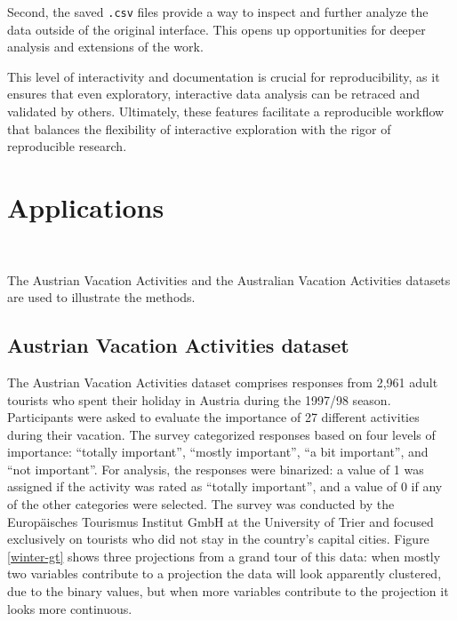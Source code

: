 \documentclass[article]{ajs}
\begin{document}
Second, the saved \texttt{.csv} files provide a way to inspect and further analyze the data outside of the original interface. This opens up opportunities for deeper analysis and extensions of the work.

This level of interactivity and documentation is crucial for reproducibility, as it ensures that even exploratory, interactive data analysis can be retraced and validated by others. Ultimately, these features facilitate a reproducible workflow that balances the flexibility of interactive exploration with the rigor of reproducible research.


\section{Applications}~\label{applications}

The Austrian Vacation Activities \cite{dolnicar2003winter} and the Australian Vacation Activities \cite{cliff2009formative} datasets are used to illustrate the methods.

\subsection{Austrian Vacation Activities dataset}

The Austrian Vacation Activities dataset comprises responses from 2,961 adult tourists who spent their holiday in Austria during the 1997/98 season. Participants were asked to evaluate the importance of 27 different activities during their vacation. The survey categorized responses based on four levels of importance: ``totally important'', ``mostly important'', ``a bit important'', and ``not important''. For analysis, the responses were binarized: a value of 1 was assigned if the activity was rated as ``totally important'', and a value of 0 if any of the other categories were selected. The survey was conducted by the Europäisches Tourismus Institut GmbH at the University of Trier and focused exclusively on tourists who did not stay in the country's capital cities. Figure \ref{winter-gt} shows three projections from a grand tour of this data: when mostly two variables contribute to a projection the data will look apparently clustered, due to the binary values, but when more variables contribute to the projection it looks more continuous.
\end{document}
